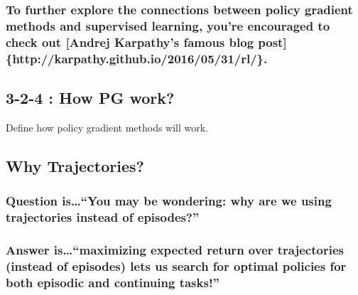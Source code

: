 \documentclass[11pt]{article}
\begin{document}
    \hypertarget{to-further-explore-the-connections-between-policy-gradient-methods-and-supervised-learning-youre-encouraged-to-check-out-andrej-karpathys-famous-blog-post-httpkarpathy.github.io20160531rl.}{%
\subsubsection{To further explore the connections between policy
gradient methods and supervised learning, you're encouraged to check out
{[}Andrej Karpathy's famous blog post{]}
\{http://karpathy.github.io/2016/05/31/rl/\}.}\label{to-further-explore-the-connections-between-policy-gradient-methods-and-supervised-learning-youre-encouraged-to-check-out-andrej-karpathys-famous-blog-post-httpkarpathy.github.io20160531rl.}}

    \hypertarget{how-pg-work}{%
\subsection{3-2-4 : How PG work?}\label{how-pg-work}}

Define how policy gradient methods will work.

    \hypertarget{why-trajectories}{%
\subsection{Why Trajectories?}\label{why-trajectories}}

\hypertarget{question-isyou-may-be-wondering-why-are-we-using-trajectories-instead-of-episodes}{%
\subsubsection{Question is\ldots{}``You may be wondering: why are we
using trajectories instead of
episodes?''}\label{question-isyou-may-be-wondering-why-are-we-using-trajectories-instead-of-episodes}}

\hypertarget{answer-ismaximizing-expected-return-over-trajectories-instead-of-episodes-lets-us-search-for-optimal-policies-for-both-episodic-and-continuing-tasks}{%
\subsubsection{Answer is\ldots{}``maximizing expected return over
trajectories (instead of episodes) lets us search for optimal policies
for both episodic and continuing
tasks!''}\label{answer-ismaximizing-expected-return-over-trajectories-instead-of-episodes-lets-us-search-for-optimal-policies-for-both-episodic-and-continuing-tasks}}
\end{document}
